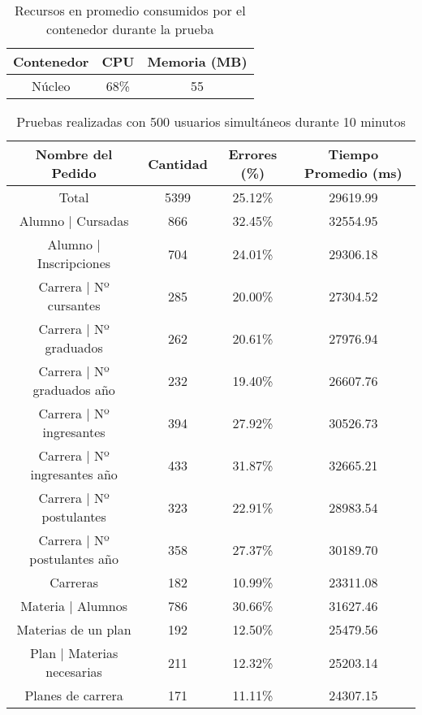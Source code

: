 \begin{table}[]
    \centering
    \makegapedcells
    \begin{tabular}{|c|c|c}
    \hline
    Contenedor & CPU & Memoria (MB)\\ \hline
    Núcleo & 68\% & 55 \\ \hline
    \end{tabular}
    \caption{Recursos en promedio consumidos por el contenedor durante la prueba}
    \label{tab:tabla_planes}
\end{table}


\begin{table}[]
    \centering
    \makegapedcells
    \begin{tabular}{|c|c|c|c|}
    \hline
    Nombre del Pedido & Cantidad & Errores (\%) & Tiempo Promedio (ms) \\ \hline
    Total & 5399 & 25.12\% & 29619.99 \\ \hline
    Alumno | Cursadas & 866 & 32.45\% & 32554.95 \\ \hline
    Alumno | Inscripciones & 704 & 24.01\% & 29306.18\\ \hline
    Carrera | Nº cursantes & 285 & 20.00\% & 27304.52\\ \hline
    Carrera | Nº graduados & 262 & 20.61\%	& 27976.94\\ \hline
    Carrera | Nº graduados año & 232 & 19.40\% & 26607.76\\ \hline
    Carrera | Nº ingresantes & 394 & 27.92\% & 30526.73\\ \hline
    Carrera | Nº ingresantes año & 433 & 31.87\% & 32665.21\\ \hline
    Carrera | Nº postulantes & 323 & 22.91\% & 28983.54\\ \hline
    Carrera | Nº postulantes año & 358 & 27.37\% & 30189.70\\ \hline
    Carreras & 182 & 10.99\% & 23311.08\\ \hline
    Materia | Alumnos & 786 & 30.66\% & 31627.46\\ \hline
    Materias de un plan & 192 & 12.50\%	& 25479.56\\ \hline
    Plan | Materias necesarias & 211 & 12.32\% & 25203.14\\ \hline
    Planes de carrera & 171 & 11.11\% & 24307.15\\ \hline

    \end{tabular}
    \caption{Pruebas realizadas con 500 usuarios simultáneos durante 10 minutos}
    \label{tab:tabla_planes}
\end{table}



